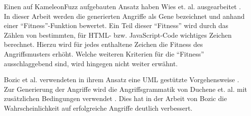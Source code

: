 Einen auf KameleonFuzz aufgebauten Ansatz haben Wies et. al.  ausgearbeitet \cite{Wies2014}. In dieser Arbeit werden die generierten Angriffe als Gene bezeichnet und anhand einer ``Fitness''-Funktion bewertet. Ein Teil dieser ``Fitness'' wird durch das Zählen von bestimmten, für HTML- bzw. JavaScript-Code wichtiges Zeichen berechnet. Hierzu wird für jedes enthaltene Zeichen die Fitness des Angriffsmusters erhöht. Welche weiteren Kriterien für die ``Fitness'' ausschlaggebend sind, wird hingegen nicht weiter erwähnt.

Bozic et al. verwendeten in ihrem Ansatz eine \ac{UML} gestützte Vorgehensweise \cite{Bozic}. Zur Generierung der Angriffe wird die Angriffsgrammatik von Duchene et. al. mit zusätzlichen Bedingungen verwendet \cite{Duchene2013a}. Dies hat in der Arbeit von Bozic die Wahrscheinlichkeit auf erfolgreiche Angriffe deutlich verbessert.